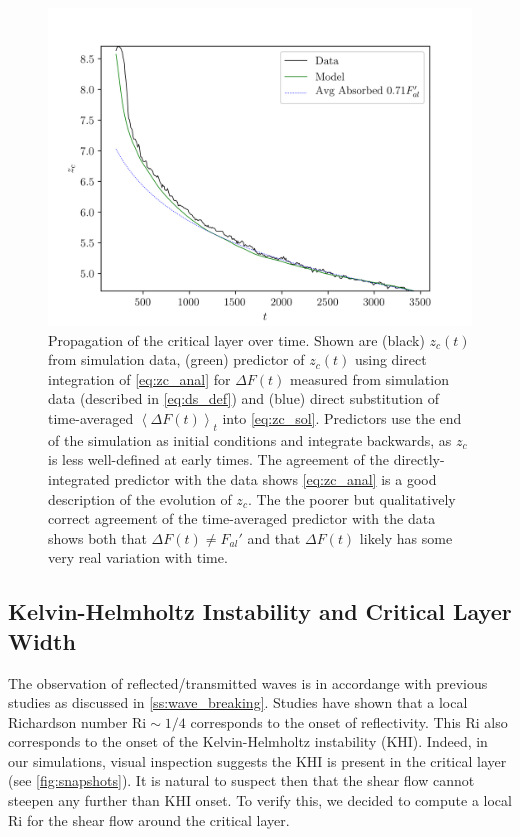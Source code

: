 \documentclass[
        fleqn,
        usenatbib,
    ]{mnras}
\newcommand*{\ev}[1]{\left\langle#1\right\rangle}
\begin{document}
\begin{figure}
    \centering
    \includegraphics[width=\columnwidth]{plots/nl_front.png}
    \caption{Propagation of the critical layer over time. Shown are (black)
    $z_c(t)$ from simulation data, (green) predictor of $z_c(t)$ using direct
    integration of \autoref{eq:zc_anal} for $\Delta F(t)$ measured from
    simulation data (described in \autoref{eq:ds_def}) and (blue) direct
    substitution of time-averaged $\ev{\Delta F(t)}_t$ into
    \autoref{eq:zc_sol}. Predictors use the end of the simulation as initial
    conditions and integrate backwards, as $z_c$ is less well-defined at early
    times. The agreement of the directly-integrated predictor with the data
    shows \autoref{eq:zc_anal} is a good description of the evolution of $z_c$.
    The the poorer but qualitatively correct agreement of the time-averaged
    predictor with the data shows both that $\Delta F(t) \neq F_{al}'$ and that
    $\Delta F(t)$ likely has some very real variation with
    time.}\label{fig:nl_front}
\end{figure}

\subsection{Kelvin-Helmholtz Instability and Critical Layer Width}\label{ss:khi}

The observation of reflected/transmitted waves is in accordange with previous
studies as discussed in \autoref{ss:wave_breaking}. Studies have shown that a
local Richardson number $\mathrm{Ri} \sim 1/4$ corresponds to the onset of
reflectivity. This $\mathrm{Ri}$ also corresponds to the onset of the
Kelvin-Helmholtz instability (KHI). Indeed, in our simulations, visual
inspection suggests the KHI is present in the critical layer (see
\autoref{fig:snapshots}). It is natural to suspect then that the shear flow
cannot steepen any further than KHI onset. To verify this, we decided to compute
a local $\mathrm{Ri}$ for the shear flow around the critical layer.
\end{document}
